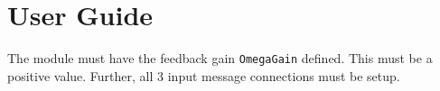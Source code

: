 
\section{User Guide}
The module must have the feedback gain {\tt OmegaGain} defined.  This must be a positive value.  Further, all 3 input message connections must be setup.
